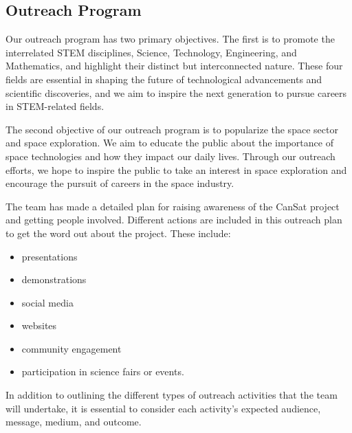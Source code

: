 \subsection{Outreach Program}

Our outreach program has two primary objectives. The first is to promote the interrelated STEM disciplines, Science, Technology, Engineering, and Mathematics, and highlight their distinct but interconnected nature. These four fields are essential in shaping the future of technological advancements and scientific discoveries, and we aim to inspire the next generation to pursue careers in STEM-related fields.

The second objective of our outreach program is to popularize the space sector and space exploration. We aim to educate the public about the importance of space technologies and how they impact our daily lives. 
Through our outreach efforts, we hope to inspire the public to take an interest in space exploration and encourage the pursuit of careers in the space industry.

The team has made a detailed plan for raising awareness of the CanSat project and getting people involved. Different actions are included in this outreach plan to get the word out about the project. These include:
\begin{multicols}{2}[\vspace{-0.5\baselineskip}]
        \begin{itemize}[leftmargin=1cm,itemindent=0.5cm,noitemsep, topsep=0pt, label=$\bullet$]
\item presentations
\item demonstrations
\item social media
\item websites
\item community engagement
\item participation in science fairs or events.
\end{itemize}
\end{multicols}
\vspace*{-0.5\baselineskip}

In addition to outlining the different types of outreach activities that the team will undertake, it is essential to consider each activity's expected audience, message, medium, and outcome.

